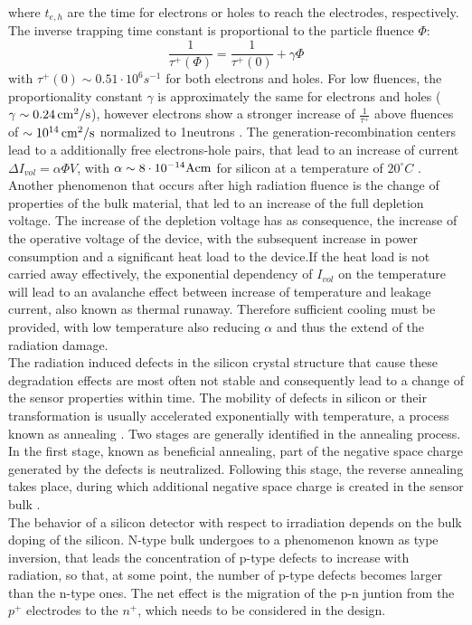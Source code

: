 where $t_{e,h}$ are the time for electrons or holes to reach the electrodes, respectively. The inverse trapping time constant is proportional to the particle fluence $\Phi$:
\begin{equation}
\frac{1}{\tau^+(\Phi)}=\frac{1}{\tau^+(0)} +\gamma \Phi
\end{equation}
with $\tau^+(0)\sim 0.51\cdot 10^6s^{-1}$ for both electrons and holes. For low fluences, the proportionality constant $\gamma$ is approximately the same for electrons and holes ($\gamma \sim \SI{0.24}{\square{\centi\meter}\per\second}$), however electrons show a stronger increase of $\frac{1}{\tau^+}$ above fluences of $\sim\SI{e14}{\square{\centi\meter}\per\second}$ normalized to 1\MeV neutrons \cite{moll}.
The generation-recombination centers lead to a additionally free electrons-hole pairs, that lead to an increase of current $\Delta I_{vol} = \alpha \Phi V$, with $\alpha\sim8\cdot10^{-14}\text{A}\SI{}{\per{\centi\meter}}$ for silicon at a temperature of $20^{\circ}C$ \cite{moll}. Another phenomenon that occurs after high radiation fluence is the change of properties of the bulk material, that led to an increase of the full depletion voltage. The increase of the depletion voltage has as consequence, the increase of the operative voltage of the device, with the subsequent increase in power consumption and a significant heat load to the device.If the heat load is not carried away effectively, the exponential dependency of $I_{vol}$ on the temperature will lead to an avalanche effect between increase of temperature and leakage current, also known as thermal runaway. Therefore sufficient cooling must be provided, with low temperature also reducing $\alpha$ and thus the extend of the radiation damage.\\
 The radiation induced defects in the silicon crystal structure that cause these degradation effects are most often not stable and consequently lead to a change of the sensor properties within time. The mobility of defects in silicon or their transformation is usually accelerated exponentially with temperature, a process known as annealing \cite{nicola_10}. Two stages are generally identified in the annealing process. In the first stage, known as beneficial annealing, part of the negative space charge generated by the defects is neutralized. Following this stage, the reverse annealing takes place, during which additional negative space charge is created in the sensor bulk \cite{nicola_10}. \\
The behavior of a silicon detector with respect to irradiation depends on the bulk doping of the silicon. N-type bulk undergoes to a phenomenon known as type inversion, that leads the concentration of p-type defects to increase with radiation, so that, at some point, the number of p-type defects becomes larger than the n-type ones. The net effect is the migration of the p-n juntion from the $p^+$ electrodes to the $n^+$, which needs to be considered in the design.\\
